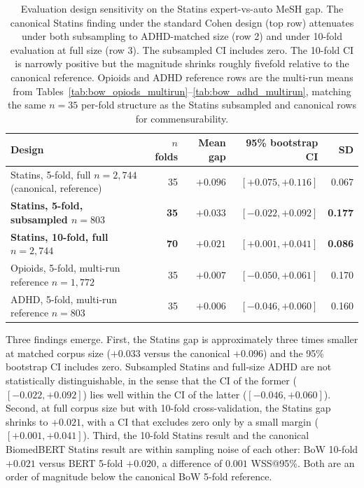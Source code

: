 \documentclass{article}
\begin{document}
\begin{table}[t]
\centering
\small
\begin{tabular}{lrrrr}
\toprule
Design & $n$ folds & Mean gap & 95\% bootstrap CI & SD \\
\midrule
Statins, 5-fold, full $n = 2{,}744$ (canonical, reference)   & 35  & $+0.096$ & $[+0.075, +0.116]$  & 0.067 \\
\textbf{Statins, 5-fold, subsampled $n = 803$}                & \textbf{35}  & \textbf{$+0.033$} & \textbf{$[-0.022, +0.092]$} & \textbf{0.177} \\
\textbf{Statins, 10-fold, full $n = 2{,}744$}                  & \textbf{70}  & \textbf{$+0.021$} & \textbf{$[+0.001, +0.041]$} & \textbf{0.086} \\
Opioids, 5-fold, multi-run reference $n = 1{,}772$              & 35  & $+0.007$ & $[-0.050, +0.061]$  & 0.170 \\
ADHD, 5-fold, multi-run reference $n = 803$                     & 35  & $+0.006$ & $[-0.046, +0.060]$  & 0.160 \\
\bottomrule
\end{tabular}
\caption{Evaluation design sensitivity on the Statins expert-vs-auto MeSH gap. The canonical Statins finding under the standard Cohen design (top row) attenuates under both subsampling to ADHD-matched size (row 2) and under 10-fold evaluation at full size (row 3). The subsampled CI includes zero. The 10-fold CI is narrowly positive but the magnitude shrinks roughly fivefold relative to the canonical reference. Opioids and ADHD reference rows are the multi-run means from Tables~\ref{tab:bow_opiods_multirun}--\ref{tab:bow_adhd_multirun}, matching the same $n = 35$ per-fold structure as the Statins subsampled and canonical rows for commensurability.}
\label{tab:design_sensitivity}
\end{table}

Three findings emerge. First, the Statins gap is approximately three times smaller at matched corpus size ($+0.033$ versus the canonical $+0.096$) and the 95\% bootstrap CI includes zero. Subsampled Statins and full-size ADHD are not statistically distinguishable, in the sense that the CI of the former ($[-0.022, +0.092]$) lies well within the CI of the latter ($[-0.046, +0.060]$). Second, at full corpus size but with 10-fold cross-validation, the Statins gap shrinks to $+0.021$, with a CI that excludes zero only by a small margin ($[+0.001, +0.041]$). Third, the 10-fold Statins result and the canonical BiomedBERT Statins result are within sampling noise of each other: BoW 10-fold $+0.021$ versus BERT 5-fold $+0.020$, a difference of $0.001$ WSS@95\%. Both are an order of magnitude below the canonical BoW 5-fold reference.
\end{document}
